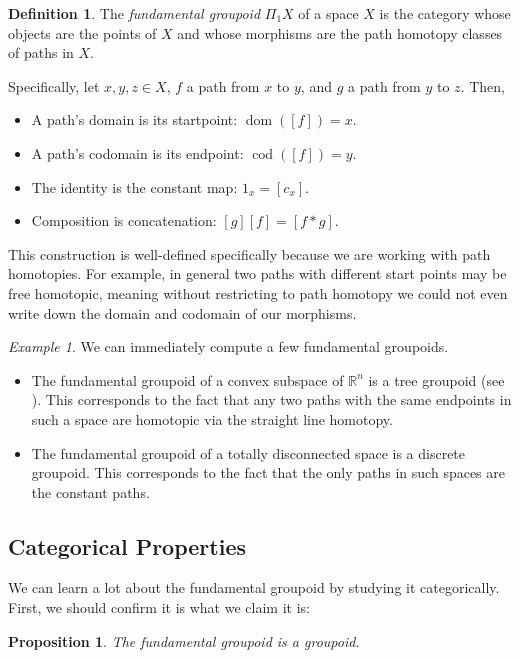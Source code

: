 \documentclass[11 pt]{amsart}
\theoremstyle{plain}   %
\newtheorem{prop}{Proposition}[section]
\theoremstyle{definition}
\newtheorem{defn}{Definition}[section]
\theoremstyle{remark}
\newtheorem{ex}{Example}[section]
\numberwithin{equation}{section}
\def\RR{\mathbb{R}}
\DeclareMathOperator{\dom}{dom}
\DeclareMathOperator{\cod}{cod}
\begin{document}
\begin{defn}
	The \emph{fundamental groupoid} $\Pi_1X$ of a space $X$ is the category
	whose objects are the points of $X$ and whose morphisms are the path homotopy
	classes of paths in $X$.
\end{defn}

Specifically, let $x,y,z\in X$, $f$ a path from $x$ to $y$, and $g$ a path from
$y$ to $z$. Then,

\begin{itemize}
	\item A path's domain is its startpoint: $\dom([f]) = x$.
	\item A path's codomain is its endpoint: $\cod([f]) = y$.
	\item The identity is the constant map: $1_x = [c_x]$.
	\item Composition is concatenation: $[g][f] = [f*g]$.
\end{itemize}

This construction is well-defined specifically because we are working with path
homotopies. For example, in general two paths with different start points may be
free homotopic, meaning without restricting to path homotopy we could not even
write down the domain and codomain of our morphisms.

\begin{ex}\cite[p. 213]{Brown}
	We can immediately compute a few fundamental groupoids.
	\begin{itemize}
		\item The fundamental groupoid of a convex subspace of $\RR^n$ is a tree
		      groupoid (see ). This corresponds to the fact that
		      any two paths with the same endpoints in such a space are homotopic via
		      the straight line homotopy.
		\item The fundamental groupoid of a totally disconnected space is a discrete
		      groupoid. This corresponds to the fact that the only paths in such spaces
		      are the constant paths.
	\end{itemize}
\end{ex}

\subsection{Categorical Properties} We can learn a lot about the fundamental
groupoid by studying it categorically. First, we should confirm it is what we
claim it is:

\begin{prop}\label{fundamental groupoid is a groupoid}
	The fundamental groupoid is a groupoid.
\end{prop}
\end{document}
